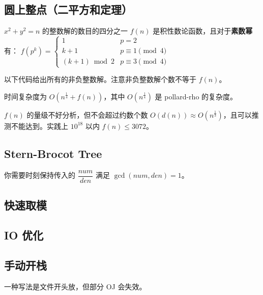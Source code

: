 \documentclass[12pt]{ctexart}
\begin{document}


\subsection{圆上整点（二平方和定理）}

$x^2+y^2=n$ 的整数解的数目的四分之一 $f(n)$ 是积性数论函数，且对于{\bf{素数幂}}有：
$f(p^k)=\begin{cases}
		1            & p=2               \\
		k+1          & p\equiv 1 \pmod 4 \\
		(k+1)\bmod 2 & p\equiv 3 \pmod 4
	\end{cases}$

以下代码给出所有的非负整数解。注意非负整数解个数不等于 $f(n)$。

时间复杂度为 $O(n^{\frac{1}{4}}+f(n))$，其中 $O(n^{\frac{1}{4}})$ 是 pollard-rho 的复杂度。

$f(n)$ 的量级不好分析，但不会超过约数个数 $O(d(n))\approx O(n^{\frac{1}{3}})$，且可以推测不能达到。实践上 $10^{18}$ 以内 $f(n)\le 3072$。



\subsection{Stern-Brocot Tree}

你需要时刻保持传入的 $\dfrac{num}{den}$ 满足 $\gcd(num,den)=1$。



\subsection{快速取模}



\subsection{IO 优化}


\subsection{手动开栈}

一种写法是文件开头放，但部分 OJ 会失效。


\end{document}
